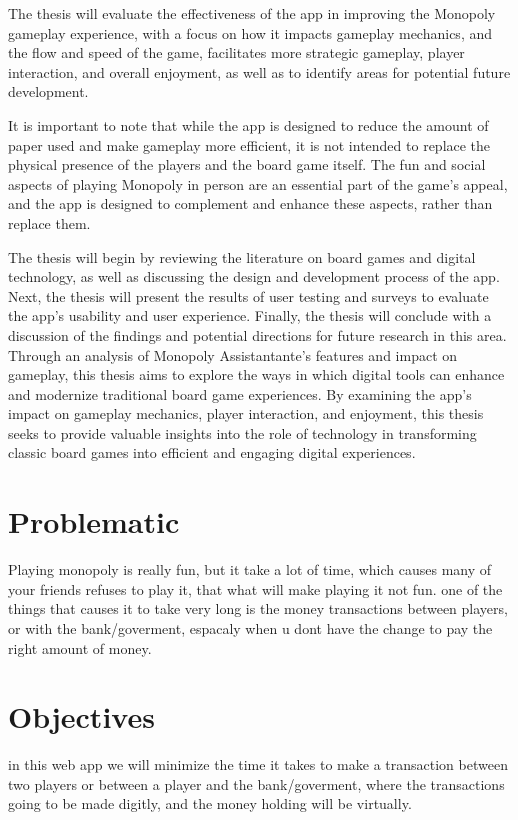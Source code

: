 \documentclass{article}
\begin{document}
	The thesis will evaluate the effectiveness of the app in improving the Monopoly gameplay experience, with a focus on how it impacts gameplay mechanics, and the flow and speed of the game, facilitates more strategic gameplay, player interaction, and overall enjoyment, as well as to identify areas for potential future development.

        It is important to note that while the app is designed to reduce the amount of paper used and make gameplay more efficient, it is not intended to replace the physical presence of the players and the board game itself. The fun and social aspects of playing Monopoly in person are an essential part of the game's appeal, and the app is designed to complement and enhance these aspects, rather than replace them.

        The thesis will begin by reviewing the literature on board games and digital technology, as well as discussing the design and development process of the app. Next, the thesis will present the results of user testing and surveys to evaluate the app's usability and user experience. Finally, the thesis will conclude with a discussion of the findings and potential directions for future research in this area.
        Through an analysis of Monopoly Assistantante's features and impact on gameplay, this thesis aims to explore the ways in which digital tools can enhance and modernize traditional board game experiences. By examining the app's impact on gameplay mechanics, player interaction, and enjoyment, this thesis seeks to provide valuable insights into the role of technology in transforming classic board games into efficient and engaging digital experiences.

\section{Problematic}\label{sec:prbm}
Playing monopoly is really fun, but it take a lot of time, which causes many of your friends refuses to play it, that what will make playing it not fun.
one of the things that causes it to take very long is the money transactions between players, or with the bank/goverment, espacaly when u dont have the change to pay the right amount of money.

\section{Objectives}\label{sec:obj}
in this web app we will minimize the time it takes to make a transaction between two players or between a player and the bank/goverment, where the transactions going to be made digitly, and the money holding will be virtually.
\end{document}
